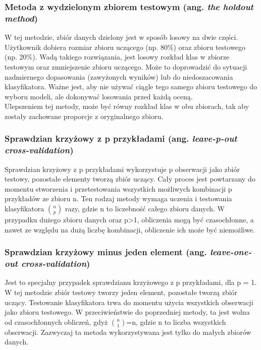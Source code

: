 \subsubsection{Metoda z wydzielonym zbiorem testowym (ang. \textit{the holdout method})}
W tej metodzie, zbiór danych dzielony jest w sposób losowy na dwie części. Użytkownik dobiera rozmiar zbioru uczącego (np. 80\%) oraz zbioru testowego (np. 20\%). Wadą takiego rozwiązania, jest losowy rozkład klas w zbiorze testowym oraz zmniejszenie zbioru uczącego. Może to doprowadzić do sytuacji nadmiernego dopasowania (zawyżonych wyników) lub do niedoszacowania klasyfikatora. Ważne jest, aby nie używać ciągle tego samego zbioru testowego do wyboru modeli, ale dokonywać losowania przed każdą oceną.\\
Ulepszeniem tej metody, może być równy rozkład klas w obu zbiorach, tak aby zostały zachowane proporcje z oryginalnego zbioru.

\subsubsection{Sprawdzian krzyżowy z p przykładami (ang. \textit{leave-p-out cross-validation})}
Sprawdzian krzyżowy z p przykładami wykorzystuje p obserwacji jako zbiór testowy, pozostałe elementy tworzą zbiór uczący. Cały proces jest powtarzany do momentu stworzenia i przetestowania wszystkich możliwych kombinacji p przykładów ze zbioru n. Ten rodzaj metody wymaga uczenia i testowania klasyfikatora $\binom{n}{p}$ razy, gdzie n to liczebność całego zbioru danych. W przypadku dużego zbioru danych oraz p>1, obliczenia mogą być czasochłonne, a nawet ze względu na dużą liczbę kombinacji, obliczenie ich może być niemożliwe.

\subsubsection{Sprawdzian krzyżowy minus jeden element (ang. \textit{leave-one-out cross-validation})}
Jest to specjalny przypadek sprawdzianu krzyżowego z p przykładami, dla p = 1. W tej metodzie zbiór testowy tworzy jeden element, pozostałe tworzą zbiór uczący. Testowanie klasyfikatora trwa do momentu użycia wszystkich obserwacji jako zbioru testowego. W przeciwieństwie do poprzedniej metody, ta jest wolna od czasochłonnych obliczeń, gdyż $\binom{n}{1}$=n, gdzie n to liczba wszystkich obserwacji. Zazwyczaj ta metoda wykorzystywana jest tylko do małych zbiorów danych.

